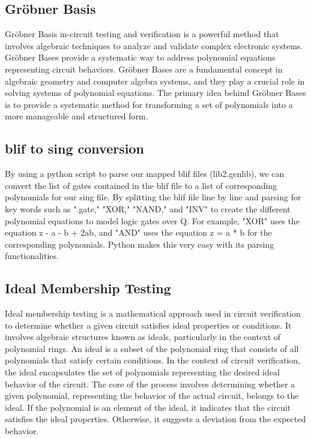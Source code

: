 \documentclass[conference]{IEEEtran}
\begin{document}
\subsection{Gröbner Basis}
Gröbner Basis in-circuit testing and verification is a powerful method that 
involves algebraic techniques to analyze and validate complex electronic systems. 
Gröbner Bases provide a systematic way to address polynomial equations representing 
circuit behaviors. Gröbner Bases are a fundamental concept in algebraic geometry and 
computer algebra systems, and they play a crucial role in solving systems of polynomial 
equations. The primary idea behind Gröbner Bases is to provide a systematic method for 
transforming a set of polynomials into a more manageable and structured form.

\subsection{blif to sing conversion}
By using a python script to parse our mapped blif files (lib2.genlib), we 
can convert the list of gates contained in the blif file to a list of 
corresponding polynomials for our sing file. By splitting the blif file line by line and
parsing for key words such as ".gate," "XOR," "NAND," and "INV" to create the different
polynomial equations to model logic gates over Q. For example, "XOR" uses 
the equation z - a - b + 2ab, and "AND" uses the equation z = a * b for the 
corresponding polynomials. Python makes this very easy with its parsing functionalities. 

\subsection{Ideal Membership Testing}
Ideal membership testing is a mathematical approach used in circuit verification to 
determine whether a given circuit satisfies ideal properties or conditions. 
It involves algebraic structures known as ideals, particularly in the 
context of polynomial rings. An ideal is a subset of the polynomial ring that consists 
of all polynomials that satisfy certain conditions. In the context of circuit 
verification, the ideal encapsulates the set of polynomials representing the 
desired ideal behavior of the circuit. The core of the process involves determining 
whether a given polynomial, representing the behavior of the actual circuit, belongs 
to the ideal. If the polynomial is an element of the ideal, it indicates that the circuit 
satisfies the ideal properties. Otherwise, it suggests a deviation from the expected behavior.
\end{document}
